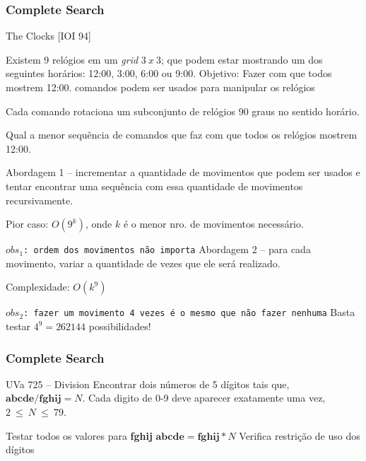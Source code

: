 \begin{frame}
\frametitle{Complete Search}
\scriptsize
\begin{block}{The Clocks [IOI 94]}
\begin{itemize}
	\bitem Existem 9 relógios em um \emph{grid} $3\ x\ 3$; que podem estar mostrando um dos seguintes horários: 12:00, 3:00, 6:00 ou 9:00.
	\bitem Objetivo: Fazer com que todos mostrem 12:00.
	 comandos podem ser usados para manipular os relógios
	\begin{itemize}
		\bitem \scriptsize Cada comando rotaciona um subconjunto de relógios 90 graus no sentido horário. 
	\end{itemize}
	\bitem Qual a menor sequência de comandos que faz com que todos os relógios mostrem 12:00.
\end{itemize}
\end{block}
\pause
\begin{block}{}
\begin{itemize}[<+->]
	\bitem Abordagem 1 -- incrementar a quantidade de movimentos que podem ser usados e tentar encontrar uma sequência com essa quantidade de movimentos recursivamente.
	\begin{itemize}
		\bitem \scriptsize Pior caso: $O(9^k)$, onde $k$ é o menor nro. de movimentos necessário.
	\end{itemize}
	\bitem \texttt{$obs_1$: ordem dos movimentos não importa}
	\bitem Abordagem 2 -- para cada movimento, variar a quantidade de vezes que ele será realizado.
	\begin{itemize}
		\bitem \scriptsize Complexidade: $O(k^9)$
	\end{itemize}
	\bitem \texttt{$obs_2$: fazer um movimento 4 vezes é o mesmo que não fazer nenhuma}
	\bitem Basta testar $4^9 = 262144$ possibilidades!
\end{itemize}
\end{block}
\end{frame}

\begin{frame}
\frametitle{Complete Search}
\begin{block}{UVa 725 -- Division}
Encontrar dois números de 5 dígitos tais que, $\textbf{abcde} / \textbf{fghij} = N$.
Cada digito de 0-9 deve aparecer exatamente uma vez, $2\  \leq\ N\ \leq\ 79$.
\end{block}
\pause
\begin{block}{}
\begin{itemize}
	\bitem Testar todos os valores para \textbf{fghij}
	\bitem $\textbf{abcde} = \textbf{fghij}*N$
	\bitem Verifica restrição de uso dos dígitos
\end{itemize}
\end{block}
\end{frame}

